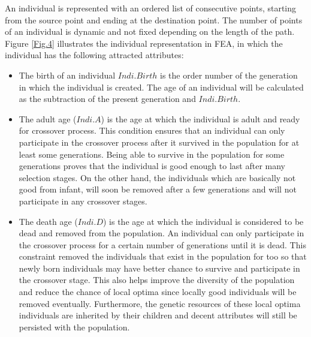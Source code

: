 \documentclass[final]{elsarticle}
\begin{document}
An individual is represented with an ordered list of consecutive points, starting from the source point and ending at the destination point. The number of points of an individual is dynamic and not fixed depending on the length of the path. Figure \ref{Fig.4} illustrates the individual representation in FEA, in which the individual has the following attracted attributes: \\
\begin{itemize}
	\item The birth of an individual $Indi.Birth$ is the order number of the generation in which the individual is created. The age of an individual will be calculated as the subtraction of the present generation and $Indi.Birth$.
	\item The adult age ($Indi.A$) is the age at which the individual is adult and ready for crossover process. This condition ensures that an individual can only participate in the crossover process after it survived in the population for at least some generations. Being able to survive in the population for some generations proves that the individual is good enough to last after many selection stages. On the other hand, the individuals which are basically not good from infant, will soon be removed after a few generations and will not participate in any crossover stages.
	\item The death age ($Indi.D$) is the age at which the individual is considered to be dead and removed from the population. An individual can only participate in the crossover process for a certain number of generations until it is dead. This constraint removed the individuals that exist in the population for too so that newly born individuals may have better chance to survive and participate in the crossover stage. This also helps improve the diversity of the population and reduce the chance of local optima since locally good individuals will be removed eventually. Furthermore, the genetic resources of these local optima individuals are inherited by their children and decent attributes will still be persisted with the population.
\end{itemize}
\end{document}
